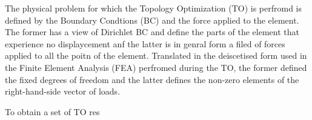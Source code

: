 
The physical problem for which the Topology Optimization (TO) is perfromd is defined by the Boundary Condtions (BC) and the force applied to the element. 
The former has a view of Dirichlet BC and define the parts of the element that experience no displaycement anf the latter is in genral form a filed of forces applied to all the poitn of the element. 
Translated in the deiscetised form used in the Finite Element Analysis (FEA) perfromed during the TO, the former defined the fixed degrees of freedom and the latter defines the non-zero elements of the right-hand-side vector of loads.

To obtain a set of TO res
 

